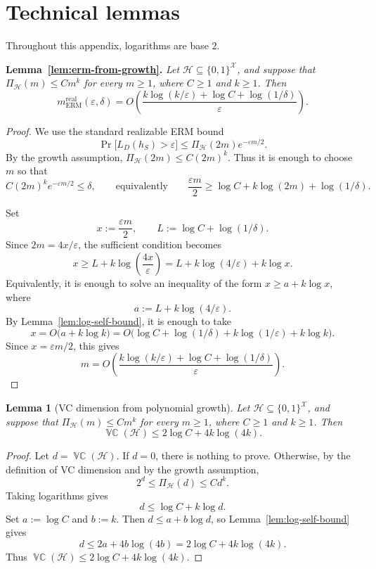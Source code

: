 \documentclass[11pt]{article}
\theoremstyle{plain}
\newtheorem{lemma}[theorem]{Lemma}
\theoremstyle{definition}
\theoremstyle{remark}
\newenvironment{restatedlemma}[1]
  {\par\noindent\textbf{Lemma~\ref{#1}.}\itshape}
  {\par}
\DeclareMathOperator{\VCdim}{\mathbb{VC}}
\begin{document}
\section{Technical lemmas}
\label{app:technical-lemmas}

Throughout this appendix, logarithms are base \(2\).

\begin{restatedlemma}{lem:erm-from-growth}
Let $\mathcal H\subseteq\{0,1\}^{\mathcal X}$, and suppose that
\(\Pi_{\mathcal H}(m)\le C m^k\) for every \(m\ge 1\), where
\(C\ge 1\) and \(k\ge 1\). Then
\[
m_{\mathrm{ERM}}^{\mathrm{real}}(\varepsilon,\delta)
=
O\left(
\frac{
k\log(k/\varepsilon)+\log C+\log(1/\delta)
}{\varepsilon}
\right).
\]
\end{restatedlemma}

\begin{proof}
We use the standard realizable ERM bound
\[
  \Pr\bigl[L_D(h_S)>\varepsilon\bigr]
  \le
  \Pi_{\mathcal H}(2m)e^{-\varepsilon m/2}.
\]
By the growth assumption, \(\Pi_{\mathcal H}(2m)\le C(2m)^k\).
Thus it is enough to choose \(m\) so that
\[
  C(2m)^k e^{-\varepsilon m/2}\le \delta,
  \qquad\text{equivalently}\qquad
  \frac{\varepsilon m}{2}
  \ge
  \log C+k\log(2m)+\log(1/\delta).
\]

Set
\[
  x:=\frac{\varepsilon m}{2},
  \qquad
  L:=\log C+\log(1/\delta).
\]
Since \(2m=4x/\varepsilon\), the sufficient condition becomes
\[
  x
  \ge
  L+k\log\left(\frac{4x}{\varepsilon}\right)
  =
  L+k\log(4/\varepsilon)+k\log x.
\]
Equivalently, it is enough to solve an inequality of the form
\(x\ge a+k\log x\), where
\[
  a:=L+k\log(4/\varepsilon).
\]
By Lemma~\ref{lem:log-self-bound}, it is enough to take
\[
  x
  =
  O\bigl(a+k\log k\bigr)
  =
  O\bigl(
  \log C+\log(1/\delta)+k\log(1/\varepsilon)+k\log k
  \bigr).
\]
Since \(x=\varepsilon m/2\), this gives
\[
m
=
O\left(
\frac{
k\log(k/\varepsilon)+\log C+\log(1/\delta)
}{\varepsilon}
\right).
\]
\end{proof}


\begin{lemma}[VC dimension from polynomial growth]
\label{lem:vc-from-growth}
Let $\mathcal H\subseteq\{0,1\}^{\mathcal X}$, and suppose that
\(\Pi_{\mathcal H}(m)\le C m^k\) for every \(m\ge 1\), where
\(C\ge 1\) and \(k\ge 1\). Then
\[
  \VCdim(\mathcal H)
  \le
  2\log C + 4k\log(4k).
\]
\end{lemma}

\begin{proof}
Let \(d=\VCdim(\mathcal H)\). If \(d=0\), there is nothing to prove.
Otherwise, by the definition of VC dimension and by the growth assumption,
\[
  2^d\le \Pi_{\mathcal H}(d)\le C d^k.
\]
Taking logarithms gives
\[
  d\le \log C+k\log d.
\]
Set \(a:=\log C\) and \(b:=k\). Then \(d\le a+b\log d\), so
Lemma~\ref{lem:log-self-bound} gives
\[
  d\le 2a+4b\log(4b)
  =
  2\log C+4k\log(4k).
\]
Thus \(\VCdim(\mathcal H)\le 2\log C+4k\log(4k)\).
\end{proof}
\end{document}
